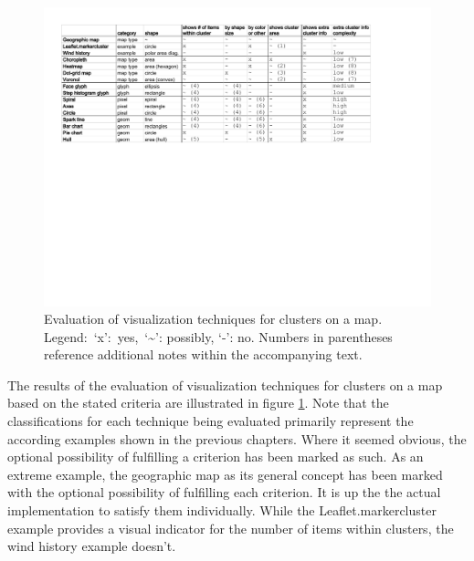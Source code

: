 \begin{figure}[h]
  \begin{center}
    \hspace*{-1.5cm}\includegraphics[width=1.2\textwidth]{figures/vis_evaluation.pdf}
    \caption{Evaluation of visualization techniques for clusters on a map. Legend:~`x':~yes,~`\textasciitilde': possibly, `-': no. Numbers in parentheses reference additional notes within the accompanying text.}
    \label{fig:vis-eval}
  \end{center}
\end{figure}

The results of the evaluation of visualization techniques for clusters on a map based on the stated criteria are illustrated in figure \ref{fig:vis-eval}. Note that the classifications for each technique being evaluated primarily represent the according examples shown in the previous chapters. Where it seemed obvious, the optional possibility of fulfilling a criterion has been marked as such. As an extreme example, the geographic map as its general concept has been marked with the optional possibility of fulfilling each criterion. It is up the the actual implementation to satisfy them individually. While the Leaflet.markercluster example provides a visual indicator for the number of items within clusters, the wind history example doesn't.


